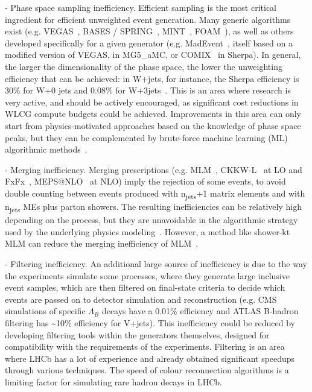\documentclass[11pt,a4paper]{article}
\begin{document}
- {Phase space sampling inefficiency}. Efficient sampling is the most
critical ingredient for efficient unweighted event generation. Many
generic algorithms exist (e.g. VEGAS~\cite{Lep80}, BASES / SPRING~\cite{Kaw86}, 
MINT~\cite{Nas07}, FOAM~\cite{Jad03}), as well as others
developed specifically for a given generator (e.g. MadEvent~\cite{Mal03},
itself based on a modified version of VEGAS, in MG5\_aMC, or COMIX~\cite{Gle08} 
in Sherpa). In general, the larger the dimensionality of the
phase space, the lower the unweighting efficiency that can be achieved:
in W+jets, for instance, the Sherpa efficiency is 30\% for W+0 jets and
0.08\% for W+3jets~\cite{Gao20}. This is an area where research is very
active, and should be actively encouraged, as significant cost
reductions in WLCG compute budgets could be achieved. Improvements in
this area can only start from physics-motivated approaches based on the
knowledge of phase space peaks, but they can be complemented by
brute-force machine learning (ML) algorithmic methods~\cite{Ben17,Bot20,Gao20,Kli18}.

- {Merging inefficiency}. Merging prescriptions (e.g. MLM~\cite{Man02},
CKKW-L~\cite{Lon02} at LO and FxFx~\cite{Fre12}, MEPS@NLO~\cite{Hoe14} at
NLO) imply the rejection of some events, to avoid double counting
between events produced with n\textsubscript{jets}+1 matrix elements and
with n\textsubscript{jets} MEs plus parton showers. The resulting
inefficiencies can be relatively high depending on the process, but they
are unavoidable in the algorithmic strategy used by the underlying
physics modeling~\cite{Alw08}. However, a method like shower-kt MLM can
reduce the merging inefficiency of MLM~\cite{Alw09}.

- {Filtering inefficiency}. An additional large source of inefficiency
is due to the way the experiments simulate some processes, where they
generate large inclusive event samples, which are then ﬁltered on
ﬁnal-state criteria to decide which events are passed on to detector
simulation and reconstruction (e.g. CMS simulations of specific
$\Lambda_{B}$ decays have a 0.01\% efficiency and ATLAS B-hadron
filtering has \textasciitilde10\% efficiency for V+jets). This
inefficiency could be reduced by developing ﬁltering tools within the
generators themselves, designed for compatibility with the requirements
of the experiments. Filtering is an area where LHCb has a lot of
experience and already obtained significant speedups through various
techniques. The speed of colour reconnection algorithms is a limiting
factor for simulating rare hadron decays in LHCb.
\end{document}
